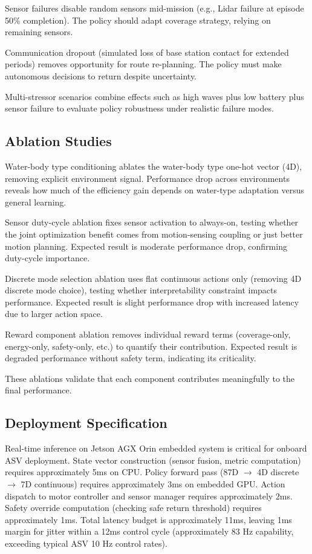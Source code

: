 Sensor failures disable random sensors mid-mission (e.g., Lidar failure at episode 50\% completion). The policy should adapt coverage strategy, relying on remaining sensors.

Communication dropout (simulated loss of base station contact for extended periods) removes opportunity for route re-planning. The policy must make autonomous decisions to return despite uncertainty.

Multi-stressor scenarios combine effects such as high waves plus low battery plus sensor failure to evaluate policy robustness under realistic failure modes.

\subsection{Ablation Studies}

Water-body type conditioning ablates the water-body type one-hot vector (4D), removing explicit environment signal. Performance drop across environments reveals how much of the efficiency gain depends on water-type adaptation versus general learning.

Sensor duty-cycle ablation fixes sensor activation to always-on, testing whether the joint optimization benefit comes from motion-sensing coupling or just better motion planning. Expected result is moderate performance drop, confirming duty-cycle importance.

Discrete mode selection ablation uses flat continuous actions only (removing 4D discrete mode choice), testing whether interpretability constraint impacts performance. Expected result is slight performance drop with increased latency due to larger action space.

Reward component ablation removes individual reward terms (coverage-only, energy-only, safety-only, etc.) to quantify their contribution. Expected result is degraded performance without safety term, indicating its criticality.

These ablations validate that each component contributes meaningfully to the final performance.

\subsection{Deployment Specification}

Real-time inference on Jetson AGX Orin embedded system is critical for onboard ASV deployment. State vector construction (sensor fusion, metric computation) requires approximately 5ms on CPU. Policy forward pass (87D $\to$ 4D discrete $\to$ 7D continuous) requires approximately 3ms on embedded GPU. Action dispatch to motor controller and sensor manager requires approximately 2ms. Safety override computation (checking safe return threshold) requires approximately 1ms. Total latency budget is approximately 11ms, leaving 1ms margin for jitter within a 12ms control cycle (approximately 83 Hz capability, exceeding typical ASV 10 Hz control rates).

